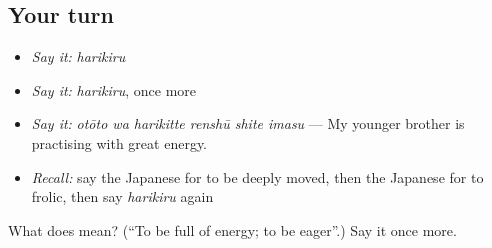 \subsection*{Your turn}
\begin{itemize}
\raggedright
  \item \emph{Say it:} \emph{harikiru}
  \item \emph{Say it:} \emph{harikiru}, once more
  \item \emph{Say it:} \emph{otōto wa harikitte renshū shite imasu} — My younger brother is practising with great energy.
  \item \emph{Recall:} say the Japanese for to be deeply moved, then the Japanese for to frolic, then say \emph{harikiru} again
\end{itemize}

\begin{tcolorbox}[breakable,colback=teal!4,colframe=teal!35!black,title={Before you move on}]
What does  mean? (\textquotedblleft{}To be full of energy; to be eager\textquotedblright{}.) Say it once more.
\end{tcolorbox}
